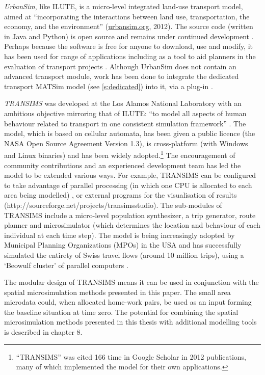 \emph{UrbanSim}, like ILUTE, is a micro-level integrated land-use transport
model, aimed at 
``incorporating the interactions between land use, transportation, the economy,
and the environment'' (\href{http://www.urbansim.org/Main/WebHome}{urbansim.org}, 2012).
The source code (written in Java and Python)
is open source and remains under continued development \citep{Nicolai2012-matsim}.
Perhaps because the software is free for anyone to download, use and modify,
it has been used for range of applications including as a tool
to aid planners in the evaluation of transport projects \citep{Borning2008}.
Although UrbanSim does not contain an advanced transport module,
work has been done to integrate the dedicated transport MATSim model (see
\cref{s:dedicated}) into it,
via a plug-in \citep{Nicolai2012-matsim}.

\emph{TRANSIMS}  was developed at the Los Alamos National
Laboratory with an
ambitious objective mirroring that of ILUTE:
``to model all aspects of human behaviour related to
transport in one consistent simulation framework''
\citep[p.~1]{nagel1999transims}.  The model, which is based on cellular
automata, has been given a public licence (the NASA Open Source Agreement
Version 1.3), is cross-platform (with Windows and Linux binaries) and has been
widely adopted.\footnote{``TRANSIMS''
was cited 166 time in Google
Scholar in 2012 publications, many of which implemented the model for their own
applications.}
The encouragement of community contributions and an experienced development team
has led the model to be extended various ways. For example, TRANSIMS can be
configured to take advantage of parallel processing (in which one CPU is
allocated to each area being modelled) \citep{nagel2001parallel}, or external
programs for the visualisation of results
(http://sourceforge.net/projects/transimsstudio). The sub-modules of TRANSIMS
include a micro-level population synthesizer, a trip generator, route planner
and microsimulator (which determines the location and behaviour of each
individual at each time step). The model is being increasingly adopted by
Municipal Planning Organizations (MPOs) in the USA \citep{lawe2009transims,
ullah2011travel} and has successfully simulated the entirety of Swiss travel
flows (around 10 million trips), using a `Beowulf cluster' of parallel computers
\citep{Raney2003}.

The modular design of TRANSIMS means it can be used in conjunction with the
spatial microsimulation methods presented in this paper. The small area
microdata could, when allocated home-work pairs, be used as an input forming
the baseline situation at time zero. The potential for combining the spatial
microsimulation methods presented in this thesis with additional modelling
tools is described in chapter 8.

